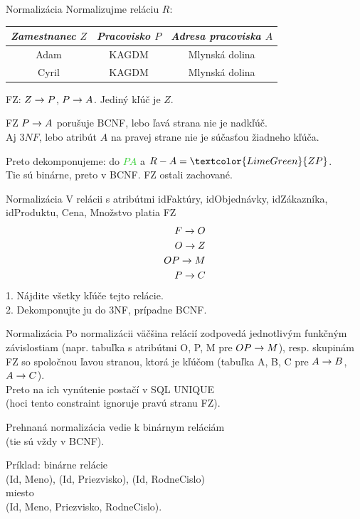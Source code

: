 \documentclass[12pt]{beamer}
\def\green#1{\textcolor{LimeGreen}{#1}}
\begin{document}
\begin{frame}[fragile]{Normalizácia}
Normalizujme reláciu $R$:\\[2mm]
\begin{tabular}{|c|c|c|}
\hline
\emph{Zamestnanec $Z$} & \emph{Pracovisko $P$} & \emph{Adresa pracoviska $A$} \\\hline
Adam & KAGDM & Mlynská dolina \\\hline
Cyril & KAGDM & Mlynská dolina \\\hline
\end{tabular}
\pause

\bigskip
FZ: $Z\rightarrow P$, $P\rightarrow A$. Jediný kľúč je $Z$.

\bigskip
FZ \alert{$P\rightarrow A$} porušuje BCNF, lebo ľavá strana nie je nadkľúč.\\
Aj $3NF$, lebo atribút $A$ na pravej strane nie je súčasťou žiadneho kľúča.

\bigskip
Preto dekomponujeme: do \green{$PA$} a $R - A = \green{ZP}$.\\
Tie sú binárne, preto v BCNF. FZ ostali zachované.
\end{frame}

\begin{frame}[fragile]{Normalizácia}
V relácii s atribútmi idFaktúry, idObjednávky, idZákazníka, idProduktu, Cena, Množstvo platia FZ
\begin{eqnarray*}
F\rightarrow O\\
O\rightarrow Z\\
OP\rightarrow M\\
P\rightarrow C
\end{eqnarray*}
1. Nájdite všetky kľúče tejto relácie.\\
2. Dekomponujte ju do 3NF, prípadne BCNF.
\end{frame}

\begin{frame}[fragile]{Normalizácia}
Po normalizácii väčšina relácií zodpovedá jednotlivým funkčným závislostiam (napr. tabuľka s atribútmi O, P, M pre $OP\rightarrow M$),
resp. skupinám FZ so spoločnou ľavou stranou, ktorá je kľúčom (tabuľka A, B, C pre $A\rightarrow B$, $A\rightarrow C$).\\
Preto na ich vynútenie postačí v SQL UNIQUE\\
(hoci tento constraint ignoruje pravú stranu FZ).
\bigskip

Prehnaná normalizácia vedie k binárnym reláciám\\
(tie sú vždy v BCNF).

\bigskip
Príklad: binárne relácie\\
(Id, Meno), (Id, Priezvisko), (Id, RodneCislo)\\
miesto\\
(Id, Meno, Priezvisko, RodneCislo).
\end{frame}
\end{document}
